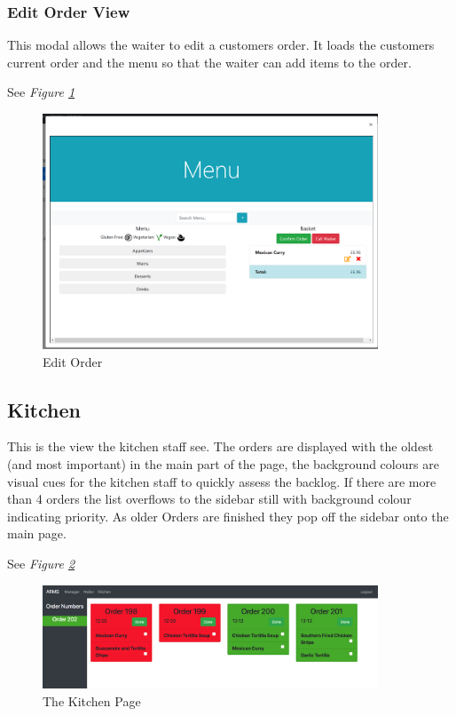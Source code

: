 \documentclass[12pt, twoside, a4paper]{report}
\begin{document}
\subsubsection*{Edit Order View}
This modal allows the waiter to edit a customers order. It loads the customers current order and the menu so that the waiter can add items to the order.

See \textit{Figure \ref{fig:editOrder}}

\begin{figure}[H]
  \centering
  \includegraphics[width=10cm]{editOrder.png}
  \caption{Edit Order}
  \label{fig:editOrder}
\end{figure}

\subsection*{Kitchen}
This is the view the kitchen staff see.
The orders are displayed with the oldest (and most important) in the main part of the page, the background colours are visual cues for the kitchen staff to quickly assess the backlog.
If there are more than 4 orders the list overflows to the sidebar still with background colour indicating priority.
As older Orders are finished they pop off the sidebar onto the main page.

See \textit{Figure \ref{fig:kitchen1}}

\begin{figure}[H]
  \centering
  \includegraphics[width=10cm]{Kitchen1.png}
  \caption{The Kitchen Page}
  \label{fig:kitchen1}
\end{figure}
\end{document}
